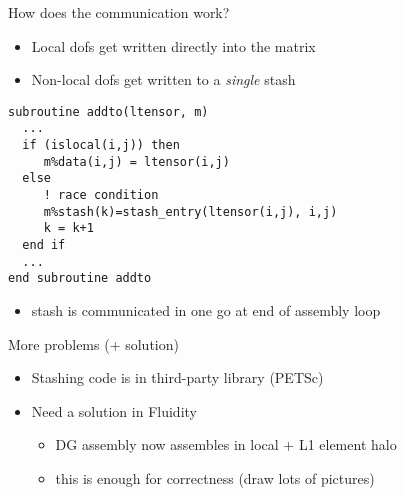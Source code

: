 \documentclass[bigger]{beamer}
\begin{document}
\begin{frame}[fragile,label={sec:orgheadline26}]{How does the communication work?}
 \begin{itemize}
\item Local dofs get written directly into the matrix
\item Non-local dofs get written to a \emph{single} stash
\end{itemize}
\begin{verbatim}
subroutine addto(ltensor, m)
  ...
  if (islocal(i,j)) then
     m%data(i,j) = ltensor(i,j)
  else
     ! race condition
     m%stash(k)=stash_entry(ltensor(i,j), i,j)
     k = k+1
  end if
  ...
end subroutine addto
\end{verbatim}
\begin{itemize}
\item stash is communicated in one go at end of assembly loop
\end{itemize}
\end{frame}

\begin{frame}[label={sec:orgheadline27}]{More problems (+ solution)}
\begin{itemize}
\item Stashing code is in third-party library (PETSc)
\item Need a solution in Fluidity
\begin{itemize}
\item DG assembly now assembles in local + L1 element halo
\item this is enough for correctness (draw lots of pictures)
\end{itemize}
\end{itemize}
\end{frame}
\end{document}
